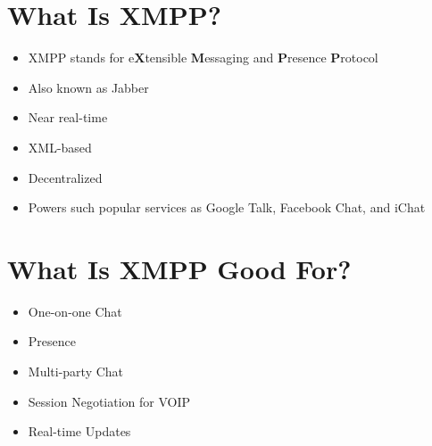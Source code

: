 \section{What Is XMPP?}
\pause

\begin{itemize}
\item XMPP stands for e\textbf{X}tensible \textbf{M}essaging and \textbf{P}resence \textbf{P}rotocol
\pause
\item Also known as Jabber
\pause
\item Near real-time
\pause
\item XML-based
\pause
\item Decentralized
\pause
\item Powers such popular services as Google Talk, Facebook Chat, and iChat
\end{itemize}

\newpage
\section{What Is XMPP Good For?}
\pause

\begin{itemize}
\item One-on-one Chat
\pause
\item Presence
\pause
\item Multi-party Chat
\pause
\item Session Negotiation for VOIP
\pause
\item Real-time Updates
\end{itemize}
